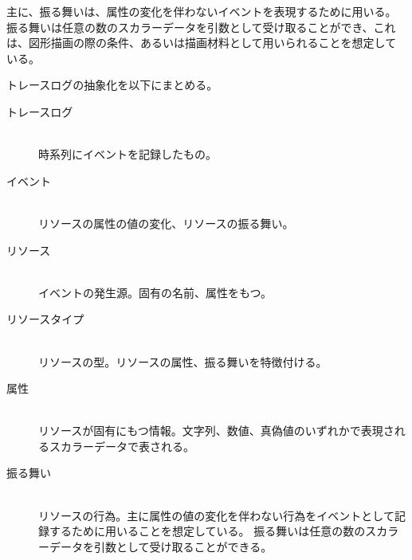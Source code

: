 主に、振る舞いは、属性の変化を伴わないイベントを表現するために用いる。
振る舞いは任意の数のスカラーデータを引数として受け取ることができ、これ
は、図形描画の際の条件、あるいは描画材料として用いられることを想定して
いる。


トレースログの抽象化を以下にまとめる。

\begin{description}
\item[トレースログ] \mbox{} \\
時系列にイベントを記録したもの。
\item[イベント] \mbox{} \\
リソースの属性の値の変化、リソースの振る舞い。
\item[リソース] \mbox{} \\
イベントの発生源。固有の名前、属性をもつ。
\item[リソースタイプ] \mbox{} \\
リソースの型。リソースの属性、振る舞いを特徴付ける。
\item[属性] \mbox{} \\
リソースが固有にもつ情報。文字列、数値、真偽値のいずれかで表現されるスカラーデータで表される。
\item[振る舞い] \mbox{} \\
リソースの行為。主に属性の値の変化を伴わない行為をイベントとして記録するために用いることを想定している。
振る舞いは任意の数のスカラーデータを引数として受け取ることができる。
\end{description}


